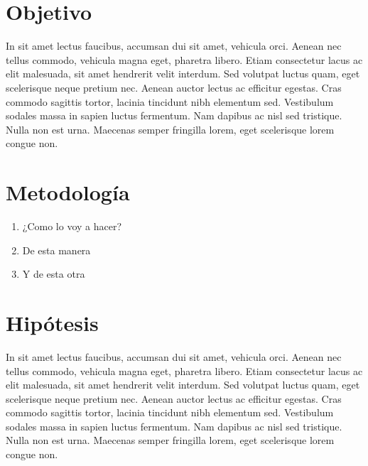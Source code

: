 \documentclass[12pt]{article}
\begin{document}
        \section{Objetivo}
        In sit amet lectus faucibus, accumsan dui sit amet, vehicula orci. Aenean nec tellus commodo, vehicula magna eget, pharetra libero. Etiam consectetur lacus ac elit malesuada, sit amet hendrerit velit interdum. Sed volutpat luctus quam, eget scelerisque neque pretium nec. Aenean auctor lectus ac efficitur egestas. Cras commodo sagittis tortor, lacinia tincidunt nibh elementum sed. Vestibulum sodales massa in sapien luctus fermentum. Nam dapibus ac nisl sed tristique. Nulla non est urna. Maecenas semper fringilla lorem, eget scelerisque lorem congue non. 
    \section{Metodología}
        \begin{enumerate}
            \item ¿Como lo voy a hacer?
            \item De esta manera
            \item Y de esta otra
        \end{enumerate}
    \newpage
    \section{Hipótesis}
         In sit amet lectus faucibus, accumsan dui sit amet, vehicula orci. Aenean nec tellus commodo, vehicula magna eget, pharetra libero. Etiam consectetur lacus ac elit malesuada, sit amet hendrerit velit interdum. Sed volutpat luctus quam, eget scelerisque neque pretium nec. Aenean auctor lectus ac efficitur egestas. Cras commodo sagittis tortor, lacinia tincidunt nibh elementum sed. Vestibulum sodales massa in sapien luctus fermentum. Nam dapibus ac nisl sed tristique. Nulla non est urna. Maecenas semper fringilla lorem, eget scelerisque lorem congue non. 
\end{document}
